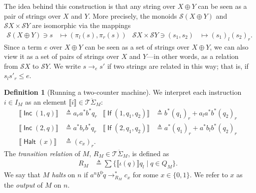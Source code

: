\documentclass[11pt,a4paper]{amsart}
\theoremstyle{definition}
\newtheorem{definition}[theorem]{Definition}
\DeclareMathOperator{\Inc}{\mathsf{Inc}}
\DeclareMathOperator{\If}{\mathsf{If}}
\DeclareMathOperator{\Halt}{\mathsf{Halt}}
\begin{document}
The idea behind this construction is that any string over $X \oplus Y$ can be
seen as a pair of strings over $X$ and $Y$.  More precisely, the monoids
$\mathcal{S}(X \oplus Y)$ and $\mathcal{S}X \times \mathcal{S}Y$ are isomorphic
via the mappings
\begin{align*}
  \mathcal{S}(X  \oplus  Y)  \ni  s &  \mapsto  ( \pi _l(s),  \pi _r(s))  &
  \mathcal{S}X  \times  \mathcal{S}Y  \ni  (s_1,s_2) &  \mapsto  (s_1)_l(s_2)_r.
\end{align*}
Since a term $e$ over $X \oplus Y$ can be seen as a set of strings over
$X \oplus Y$, we can also view it as a set of pairs of strings over $X$ and
$Y$---in other words, as a relation from $\mathcal{S}X$ to $\mathcal{S}Y$.  We
write $s \to _e s'$ if two strings are related in this way; that is, if
$s_ls'_r \leq e$.

\begin{definition}[Running a two-counter machine]
  \label{def:two-counter-transition}
  We interpret each instruction $i  \in  I_M$ as an element $ \llbracket i \rrbracket   \in  \mathcal{T}\ddot{ \Sigma }_M$:
  \begin{align*}
     \llbracket \Inc(1,q) \rrbracket  &  \triangleq  a_ra^*b^*q_r &
     \llbracket \If(1,q_{1},q_{2}) \rrbracket  &  \triangleq  b^*(q_{1})_r + a_la^*b^*(q_{2})_r \\
     \llbracket \Inc(2,q) \rrbracket  &  \triangleq  a^*b_rb^*q_r &
     \llbracket \If(2,q_{1},q_{2}) \rrbracket  &  \triangleq  a^*(q_{1})_r + a^*b_lb^*(q_{2})_r \\
     \llbracket \Halt(x) \rrbracket  &  \triangleq  (c_x)_r.
  \end{align*}
  The \emph{transition relation} of $M$, $R_M  \in  \mathcal{T}\ddot{ \Sigma }_M$, is defined as
  \begin{align*}
     R_M &  \triangleq   \sum \{ \llbracket  \iota (q) \rrbracket q_l \mid q  \in  Q_M \}.
  \end{align*}
  We say that $M$ \emph{halts} on $n$ if $a^nb^0\dot{q}  \to _{R_M}^* c_x$ for some
  $x  \in  \{0,1\}$.  We refer to $x$ as the \emph{output} of $M$ on $n$.
\end{definition}
\end{document}
